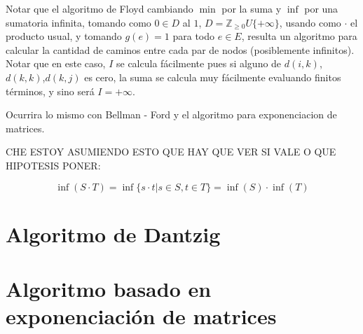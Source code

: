 \documentclass{article}
\begin{document}
Notar que el algoritmo de Floyd cambiando $\min$ por la suma y $\inf$ por una sumatoria infinita, 
tomando como $0 \in D$ al $1$, $D = \mathbb{Z}_{\geq 0} U \{ +\infty \}$,
usando como $\cdot$ el producto usual, y tomando $g(e) = 1$ para todo $e \in E$, resulta un algoritmo
para calcular la cantidad de caminos entre cada par de nodos (posiblemente infinitos). Notar que en
este caso, $I$ se calcula fácilmente pues si alguno de $d(i,k)$,$d(k,k)$,$d(k,j)$ es cero, la suma
se calcula muy fácilmente evaluando finitos términos, y sino será $I= +\infty$.

Ocurrira lo mismo con Bellman - Ford y el algoritmo para exponenciacion de matrices.

CHE ESTOY ASUMIENDO ESTO QUE HAY QUE VER SI VALE O QUE HIPOTESIS PONER:

$$\inf (S \cdot T) = \inf \{ s \cdot t | s \in S, t \in T \} = \inf (S) \cdot \inf (T)$$

\section{Algoritmo de Dantzig}

\section{Algoritmo basado en exponenciación de matrices}
\end{document}

